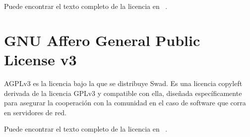 Puede encontrar el texto completo de la licencia en ~\cite{LGPL:lgpl}.

\section{GNU Affero General Public License v3}
AGPLv3 es la licencia bajo la que se distribuye Swad. Es una licencia copyleft derivada de la licencia GPLv3 y compatible con ella, diseñada específicamente para asegurar la cooperación con la comunidad en el caso de software que corra en servidores de red. 

Puede encontrar el texto completo de la licencia en ~\cite{AGPL:agpl}.

